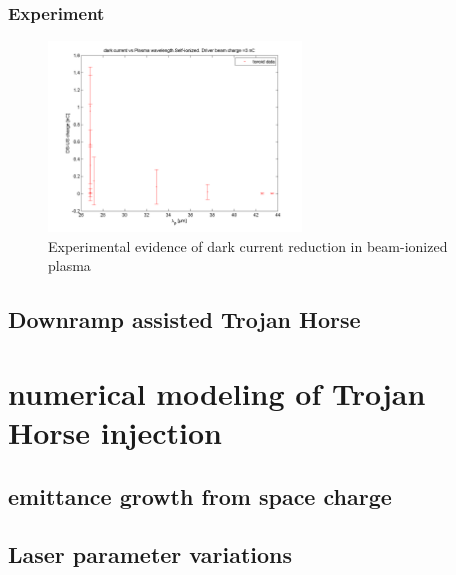 \subsubsection{Experiment}
\begin{figure}
\begin{center}
\includegraphics[width=0.6\textwidth]{experiment/images/raw/DC_over_Lp_3nC_self20150518.png}
\end{center}
\caption{Experimental evidence of dark current reduction in beam-ionized plasma}
\end{figure}

	
\subsection{Downramp assisted Trojan Horse}

\section{numerical modeling of Trojan Horse injection}

\subsection{emittance growth from space charge}
\subsection{Laser parameter variations}
	

